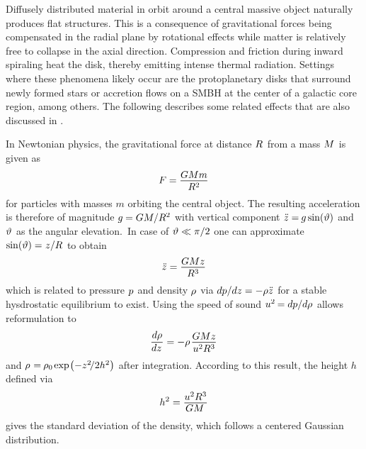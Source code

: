 Diffusely distributed material in orbit around a central massive object naturally produces flat structures. This is a
consequence of gravitational forces being compensated in the radial plane by rotational effects while matter is relatively
free to collapse in the axial direction. Compression and friction during inward spiraling heat the disk, thereby emitting
intense thermal radiation. Settings where these phenomena likely occur are the protoplanetary disks that surround newly formed
stars or accretion flows on a SMBH at the center of a galactic core region, among others. The following describes some related effects
that are also discussed in \cite{Longair_2011}.

In Newtonian physics, the gravitational force at distance $R \kern+0.5pt$ from a mass $M \kern+0.5pt$ is given as
\begin{equation}
	F = \frac{\raisebox{-0.3ex}{$GMm$}}{R^2}
	\label{eqn:newton}
\end{equation}
for particles with masses $m$ orbiting the central object. The resulting acceleration is therefore of magnitude
$g \kern-0.3pt = GM / \smash{R^2}$ with vertical component $\ddot{z} = \kern-0.6pt g \sin(\vartheta)$ and
$\vartheta \kern+0.5pt$ as the angular elevation.~In case of $\kern+0.5pt \vartheta \ll \pi / 2$ one can approximate
$\sin(\vartheta) = \kern+0.3pt z / \kern-0.2pt R \kern+0.5pt$ to obtain
\begin{equation}
	\ddot{z} = \frac{\raisebox{-0.3ex}{$GMz$}}{R^3}
\end{equation}
which is related to pressure $p \kern+0.5pt$ and density $\kern-0.5pt \rho \kern+0.5pt$ via
$d \kern-0.1pt p / \kern-0.1pt dz = -\rho \ddot{z} \kern+0.5pt$ for a stable hysdrostatic equilibrium to exist. Using the speed
of sound $\smash{u^2} \kern-0.7pt = d \kern-0.1pt p / \kern-0.1pt d \kern-0.1pt \rho \kern+0.5pt$ allows reformulation to
\begin{equation}
	\frac{d \kern-0.1pt \rho}{\raisebox{0.2ex}{$dz \kern+1.0pt$}} =
	-\rho \kern+1.0pt \frac{\raisebox{-0.3ex}{$GMz$}}{u^2R^3}
\end{equation}
and $\rho \kern+0.6pt = \kern-0.6pt \rho_0 \kern-0.5pt \exp \kern-1.0pt \smash{\bigl( -z^2 \kern-1.8pt / 2 h^2 \bigr)}$
after integration. According to this result, the height $h$ defined via
\begin{equation}
	h^2 = \frac{\raisebox{-0.3ex}{$u^2R^3$}}{\raisebox{0.2ex}{$GM \kern+1.5pt$}}
\end{equation}
gives the standard deviation of the density, which follows a centered Gaussian distribution.

